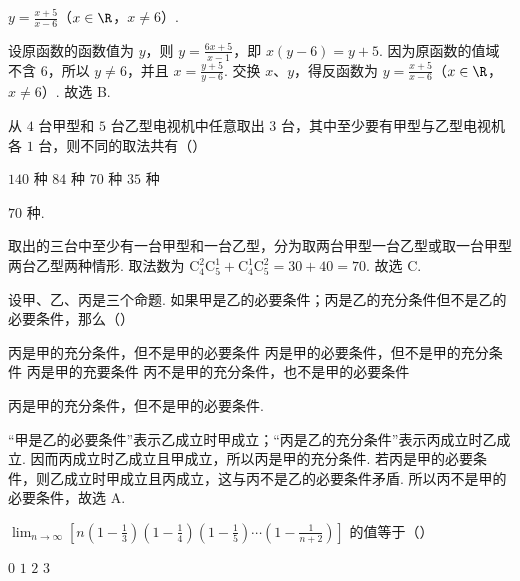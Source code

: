\begin{answer}
\(y=\frac{x+5}{x-6}\)（\(x\in\R\)，\(x\neq6\)）.
\end{answer}

\begin{solution}
设原函数的函数值为 \(y\)，则 \(y=\frac{6x+5}{x-1}\)，即 \(x(y-6)=y+5\). 因为原函数的值域不含 \(6\)，所以 \(y\neq6\)，并且 \(x=\frac{y+5}{y-6}\). 交换 \(x\)、\(y\)，得反函数为 \(y=\frac{x+5}{x-6}\)（\(x\in\R\)，\(x\neq6\)）. 故选 B.
\end{solution}

\begin{problem}
从 \(4\) 台甲型和 \(5\) 台乙型电视机中任意取出 \(3\) 台，其中至少要有甲型与乙型电视机各 \(1\) 台，则不同的取法共有（\quad）

\choices
    {\(140\) 种}
    {\(84\) 种}
    {\(70\) 种}
    {\(35\) 种}
\end{problem}

\begin{answer}
\(70\) 种.
\end{answer}

\begin{solution}
取出的三台中至少有一台甲型和一台乙型，分为取两台甲型一台乙型或取一台甲型两台乙型两种情形. 取法数为 \(\mathrm C_4^2\mathrm C_5^1+\mathrm C_4^1\mathrm C_5^2=30+40=70\). 故选 C.
\end{solution}

\begin{problem}
设甲、乙、丙是三个命题. 如果甲是乙的必要条件；丙是乙的充分条件但不是乙的必要条件，那么（\quad）

\choices
    {丙是甲的充分条件，但不是甲的必要条件}
    {丙是甲的必要条件，但不是甲的充分条件}
    {丙是甲的充要条件}
    {丙不是甲的充分条件，也不是甲的必要条件}
\end{problem}

\begin{answer}
丙是甲的充分条件，但不是甲的必要条件.
\end{answer}

\begin{solution}
“甲是乙的必要条件”表示乙成立时甲成立；“丙是乙的充分条件”表示丙成立时乙成立. 因而丙成立时乙成立且甲成立，所以丙是甲的充分条件. 若丙是甲的必要条件，则乙成立时甲成立且丙成立，这与丙不是乙的必要条件矛盾. 所以丙不是甲的必要条件，故选 A.
\end{solution}

\begin{problem}
\(\displaystyle\lim_{n\to \infty}\left[n\left(1 - \frac{1}{3}\right)\left(1 - \frac{1}{4}\right)\left(1 - \frac{1}{5}\right)\cdots \left(1 - \frac{1}{n + 2}\right)\right]\) 的值等于（\quad）

\choices
    {\(0\)}
    {\(1\)}
    {\(2\)}
    {\(3\)}
\end{problem}

